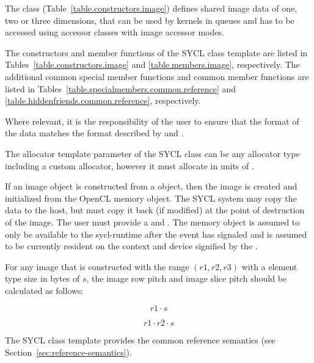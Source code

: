 The class 
(Table~\ref{table.constructors.image}) defines shared image data of one,
two or three dimensions, that can be used by kernels in queues and has to
be accessed using \gls{accessor} classes with image accessor modes.

The constructors and member functions of the SYCL  class template are listed in Tables~\ref{table.constructors.image} and \ref{table.members.image}, respectively. The additional common special member functions and common member functions are listed in Tables~\ref{table.specialmembers.common.reference} and \ref{table.hiddenfriends.common.reference}, respectively.

Where relevant, it is the
responsibility of the user to ensure that the format of the data
matches the format described by
 and .

The allocator template parameter of the SYCL  class can be any allocator type including a custom allocator, however it must allocate in units of .

If an image object is constructed from a  object,
then the image is created and initialized from the OpenCL memory
object. The SYCL system may copy the data to the host, but must copy
it back (if modified) at the point of destruction of the image.
The user must provide a  and
. The memory object is assumed to only be available to the
\gls{sycl-runtime} after the event has signaled and is assumed to be
currently resident on the context and device signified by the
.

For any image that is constructed with the range $(r1, r2, r3)$ with a element
type size in bytes of $s$, the image row pitch and image slice pitch should be
calculated as follows:

\begin{equation}
\label{image-row-pitch}
 r1 \cdot s
\end{equation}

\begin{equation}
\label{image-slice-pitch}
 r1 \cdot r2 \cdot s
\end{equation}

The SYCL  class template provides the common reference
semantics (see Section~\ref{sec:reference-semantics}).

